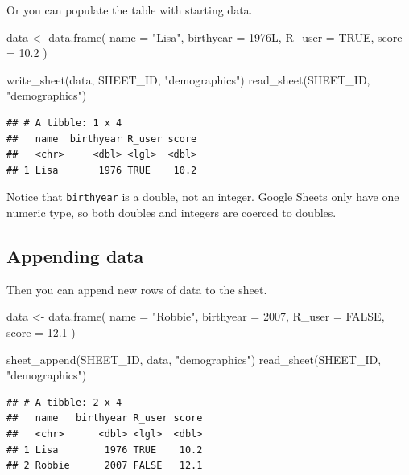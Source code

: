 \documentclass[
]{book}
\newenvironment{Shaded}{\begin{snugshade}}{\end{snugshade}}
\newcommand{\AttributeTok}[1]{\textcolor[rgb]{0.77,0.63,0.00}{#1}}
\newcommand{\ConstantTok}[1]{\textcolor[rgb]{0.00,0.00,0.00}{#1}}
\newcommand{\DecValTok}[1]{\textcolor[rgb]{0.00,0.00,0.81}{#1}}
\newcommand{\FloatTok}[1]{\textcolor[rgb]{0.00,0.00,0.81}{#1}}
\newcommand{\FunctionTok}[1]{\textcolor[rgb]{0.00,0.00,0.00}{#1}}
\newcommand{\NormalTok}[1]{#1}
\newcommand{\OtherTok}[1]{\textcolor[rgb]{0.56,0.35,0.01}{#1}}
\newcommand{\StringTok}[1]{\textcolor[rgb]{0.31,0.60,0.02}{#1}}
\begin{document}
Or you can populate the table with starting data.

\begin{Shaded}
\begin{Highlighting}[]
\NormalTok{data }\OtherTok{\textless{}{-}} \FunctionTok{data.frame}\NormalTok{(}
  \AttributeTok{name =} \StringTok{"Lisa"}\NormalTok{,}
  \AttributeTok{birthyear =}\NormalTok{ 1976L,}
  \AttributeTok{R\_user =} \ConstantTok{TRUE}\NormalTok{,}
  \AttributeTok{score =} \FloatTok{10.2}
\NormalTok{)}

\FunctionTok{write\_sheet}\NormalTok{(data, SHEET\_ID, }\StringTok{"demographics"}\NormalTok{)}
\FunctionTok{read\_sheet}\NormalTok{(SHEET\_ID, }\StringTok{"demographics"}\NormalTok{)}
\end{Highlighting}
\end{Shaded}

\begin{verbatim}
## # A tibble: 1 x 4
##   name  birthyear R_user score
##   <chr>     <dbl> <lgl>  <dbl>
## 1 Lisa       1976 TRUE    10.2
\end{verbatim}

Notice that \texttt{birthyear} is a double, not an integer. Google Sheets only have one numeric type, so both doubles and integers are coerced to doubles.

\hypertarget{appending-data}{%
\subsection{Appending data}\label{appending-data}}

Then you can append new rows of data to the sheet.

\begin{Shaded}
\begin{Highlighting}[]
\NormalTok{data }\OtherTok{\textless{}{-}} \FunctionTok{data.frame}\NormalTok{(}
  \AttributeTok{name =} \StringTok{"Robbie"}\NormalTok{,}
  \AttributeTok{birthyear =} \DecValTok{2007}\NormalTok{,}
  \AttributeTok{R\_user =} \ConstantTok{FALSE}\NormalTok{,}
  \AttributeTok{score =} \FloatTok{12.1}
\NormalTok{)}

\FunctionTok{sheet\_append}\NormalTok{(SHEET\_ID, data, }\StringTok{"demographics"}\NormalTok{)}
\FunctionTok{read\_sheet}\NormalTok{(SHEET\_ID, }\StringTok{"demographics"}\NormalTok{)}
\end{Highlighting}
\end{Shaded}

\begin{verbatim}
## # A tibble: 2 x 4
##   name   birthyear R_user score
##   <chr>      <dbl> <lgl>  <dbl>
## 1 Lisa        1976 TRUE    10.2
## 2 Robbie      2007 FALSE   12.1
\end{verbatim}
\end{document}
